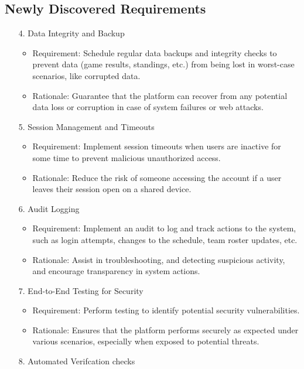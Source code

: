 \documentclass{article}
\begin{document}
\subsection{Newly Discovered Requirements}
\begin{enumerate}
    \item[4.] Data Integrity and Backup
        \begin{itemize}
            \item Requirement: Schedule regular data backups and integrity checks to prevent data (game results, standings, etc.)  from being lost in worst-case scenarios, like corrupted data.
            \item Rationale: Guarantee that the platform can recover from any potential data loss or corruption in case of system failures or web attacks.
        \end{itemize}
    \item[5.] Session Management and Timeouts
        \begin{itemize}
            \item Requirement: Implement session timeouts when users are inactive for some time to prevent malicious unauthorized access.
            \item Rationale: Reduce the risk of someone accessing the account if a user leaves their session open on a shared device.
        \end{itemize}
    \item[6.] Audit Logging
        \begin{itemize}
            \item Requirement: Implement an audit to log and track actions to the system, such as login attempts, changes to the schedule, team roster updates, etc.
            \item Rationale: Assist in troubleshooting, and detecting suspicious activity, and encourage transparency in system actions.
        \end{itemize}
    \item[7.] End-to-End Testing for Security
        \begin{itemize}
            \item Requirement: Perform testing to identify potential security vulnerabilities.
            \item Rationale: Ensures that the platform performs securely as expected under various scenarios, especially when exposed to potential threats.
        \end{itemize}
    \item[8.] Automated Verifcation checks

\end{enumerate}
\end{document}
